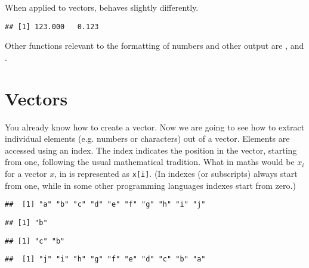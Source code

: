 \documentclass[paper=a4,10pt,div=17,headsepline,BCOR=12mm,twoside,open=right]{scrbook}\usepackage{knitr}
\begin{document}
When applied to vectors,  behaves slightly differently.

\begin{knitrout}\footnotesize
{}\color{fgcolor}\begin{kframe}
\begin{alltt}
\hlstd{(}\hlstd{(}\hlstd{,} \hlstd{),} \hlstd{)}
\end{alltt}
\begin{verbatim}
## [1] 123.000   0.123
\end{verbatim}
\end{kframe}
\end{knitrout}

Other functions relevant to the formatting of numbers and other output are , and .

\section{Vectors}

You already know how to create a vector. Now we are going to see how to extract individual elements (e.g. numbers or characters) out of a vector. Elements are accessed using an index. The index indicates the position in the vector, starting from one, following the usual mathematical tradition. What in maths would be $x_i$ for a vector $x$, in \R is represented as \texttt{x[i]}. (In \R indexes (or subscripts) always start from one, while in some other programming languages indexes start from zero.)

\begin{knitrout}\footnotesize
{}\color{fgcolor}\begin{kframe}
\begin{alltt}
 \hlkwb{<-} \hlstd{letters[}\hlopt{:}\hlstd{]}
\end{alltt}
\begin{verbatim}
##  [1] "a" "b" "c" "d" "e" "f" "g" "h" "i" "j"
\end{verbatim}
\begin{alltt}
\hlstd{a[}\hlstd{]}
\end{alltt}
\begin{verbatim}
## [1] "b"
\end{verbatim}
\begin{alltt}
\hlstd{a[}\hlstd{(}\hlstd{,}\hlstd{)]}
\end{alltt}
\begin{verbatim}
## [1] "c" "b"
\end{verbatim}
\begin{alltt}
\hlstd{a[}\hlopt{:}\hlstd{]}
\end{alltt}
\begin{verbatim}
##  [1] "j" "i" "h" "g" "f" "e" "d" "c" "b" "a"
\end{verbatim}
\end{kframe}
\end{knitrout}
\end{document}
